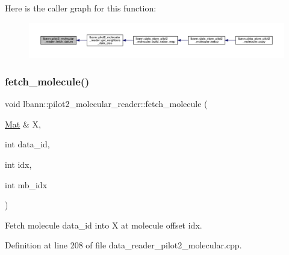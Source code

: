 Here is the caller graph for this function\+:\nopagebreak
\begin{figure}[H]
\begin{center}
\leavevmode
\includegraphics[width=350pt]{classlbann_1_1pilot2__molecular__reader_a9ad317abcd6f5de777d536f7796a3b12_icgraph}
\end{center}
\end{figure}
\mbox{\label{classlbann_1_1pilot2__molecular__reader_ae45c583f72e11aeb5d955e2657a9a3e8}} 
\subsubsection{\texorpdfstring{fetch\+\_\+molecule()}{fetch\_molecule()}}
{\footnotesize\ttfamily void lbann\+::pilot2\+\_\+molecular\+\_\+reader\+::fetch\+\_\+molecule (\begin{DoxyParamCaption}\item[{\hyperlink{base_8hpp_a68f11fdc31b62516cb310831bbe54d73}{Mat} \&}]{X,  }\item[{int}]{data\+\_\+id,  }\item[{int}]{idx,  }\item[{int}]{mb\+\_\+idx }\end{DoxyParamCaption})\hspace{0.3cm}{\ttfamily [protected]}}



Fetch molecule data\+\_\+id into X at molecule offset idx. 



Definition at line 208 of file data\+\_\+reader\+\_\+pilot2\+\_\+molecular.\+cpp.


